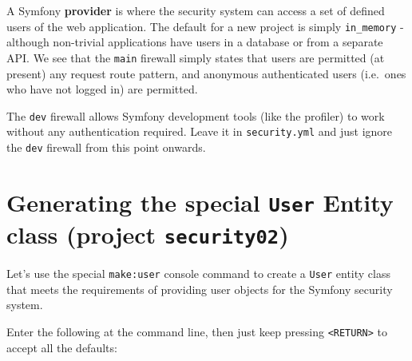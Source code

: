 \documentclass[a4paperpaper,openright]{book}
\begin{document}
A Symfony \textbf{provider} is where the security system can access a
set of defined users of the web application. The default for a new
project is simply \texttt{in\_memory} - although non-trivial
applications have users in a database or from a separate API. We see
that the \texttt{main} firewall simply states that users are permitted
(at present) any request route pattern, and anonymous authenticated
users (i.e.~ones who have not logged in) are permitted.

The \texttt{dev} firewall allows Symfony development tools (like the
profiler) to work without any authentication required. Leave it in
\texttt{security.yml} and just ignore the \texttt{dev} firewall from
this point onwards.

\hypertarget{generating-the-special-user-entity-class-project-security02}{%
\section{\texorpdfstring{Generating the special \texttt{User} Entity
class (project
\texttt{security02})}{Generating the special User Entity class (project security02)}}\label{generating-the-special-user-entity-class-project-security02}}

Let's use the special \texttt{make:user} console command to create a
\texttt{User} entity class that meets the requirements of providing user
objects for the Symfony security system.

Enter the following at the command line, then just keep pressing
\texttt{\textless{}RETURN\textgreater{}} to accept all the defaults:
\end{document}
